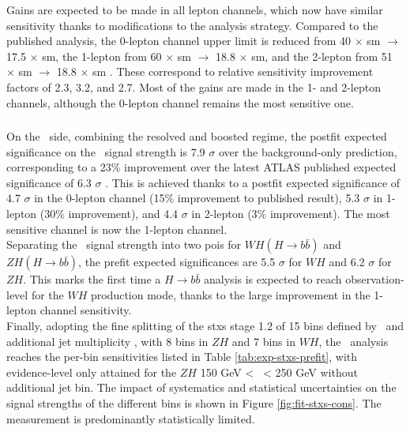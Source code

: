 Gains are expected to be made in all lepton channels, which now have similar sensitivity thanks to modifications to the analysis strategy. Compared to the published analysis, the 0-lepton channel upper limit is reduced from 40 $\times$ \gls{sm} $\rightarrow$ 17.5 $\times$ \gls{sm}, the 1-lepton from 60 $\times$ \gls{sm} $\rightarrow$ 18.8 $\times$ \gls{sm}, and the 2-lepton from 51 $\times$ \gls{sm} $\rightarrow$ 18.8 $\times$ \gls{sm} \cite{Collaboration:2721696}. These correspond to relative sensitivity improvement factors of 2.3, 3.2, and 2.7. Most of the gains are made in the 1- and 2-lepton channels, although the 0-lepton channel remains the most sensitive one.

\subsubsection{\boldvhb}
On the \vhb\ side, combining the resolved and boosted regime, the postfit expected significance on the \vhb\ signal strength is 7.9 $\sigma$ over the background-only prediction, corresponding to a 23\% improvement over the latest ATLAS published expected significance of 6.3 $\sigma$ \cite{ATLAS:2021wqh}. This is achieved thanks to a postfit expected significance of 4.7 $\sigma$ in the 0-lepton channel (15\% improvement to published result), 5.3 $\sigma$ in 1-lepton (30\% improvement), and 4.4 $\sigma$ in 2-lepton (3\% improvement). The most sensitive channel is now the 1-lepton channel. \\

Separating the \vhb\ signal strength into two \glspl{poi} for $WH(H \rightarrow{b\bar{b}})$ and $ZH(H \rightarrow{b\bar{b}})$, the prefit expected significances are 5.5 $\sigma$ for $WH$ and 6.2 $\sigma$ for $ZH$. This marks the first time a $H \rightarrow b\bar{b}$ analysis is expected to reach observation-level for the $WH$ production mode, thanks to the large improvement in the 1-lepton channel sensitivity. \\

Finally, adopting the fine splitting of the \gls{stxs} stage 1.2 of 15 bins defined by \ptv\ and additional jet multiplicity \nj, with 8 bins in $ZH$ and 7 bins in $WH$, the \vhb\ analysis reaches the per-bin sensitivities listed in Table \ref{tab:exp-stxs-prefit}, with evidence-level only attained for the $ZH$ 150 GeV < \ptv\ < 250 GeV without additional jet bin. The impact of systematics and statistical uncertainties on the signal strengths of the different bins is shown in Figure \ref{fig:fit-stxs-cons}. The measurement is predominantly statistically limited. 

